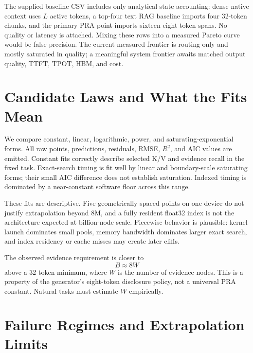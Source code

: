 \documentclass[10pt]{article}
\begin{document}
The supplied baseline CSV includes only analytical state accounting: dense native
context uses $L$ active tokens, a top-four text RAG baseline imports four
32-token chunks, and the primary PRA point imports sixteen eight-token spans.
No quality or latency is attached. Mixing these rows into a measured Pareto curve
would be false precision. The current measured frontier is routing-only and
mostly saturated in quality; a meaningful system frontier awaits matched output
quality, TTFT, TPOT, HBM, and cost.

\section{Candidate Laws and What the Fits Mean}

We compare constant, linear, logarithmic, power, and saturating-exponential forms.
All raw points, predictions, residuals, RMSE, $R^2$, and AIC values are emitted.
Constant fits correctly describe selected K/V and evidence recall in the fixed
task. Exact-search timing is fit well by linear and boundary-scale saturating
forms; their small AIC difference does not establish saturation. Indexed timing
is dominated by a near-constant software floor across this range.

These fits are descriptive. Five geometrically spaced points on one device do not
justify extrapolation beyond 8M, and a fully resident float32 index is not the
architecture expected at billion-node scale. Piecewise behavior is plausible:
kernel launch dominates small pools, memory bandwidth dominates larger exact
search, and index residency or cache misses may create later cliffs.

The observed evidence requirement is closer to
\begin{equation}
  B \approx 8W
\end{equation}
above a 32-token minimum, where $W$ is the number of evidence nodes. This is a
property of the generator's eight-token disclosure policy, not a universal PRA
constant. Natural tasks must estimate $W$ empirically.

\section{Failure Regimes and Extrapolation Limits}
\end{document}
